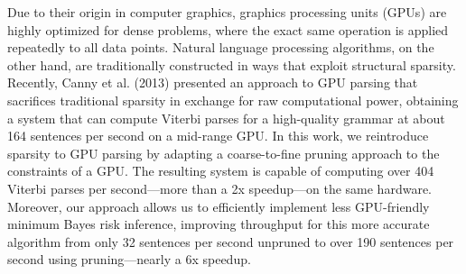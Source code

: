 Due to their origin in computer graphics, graphics processing units (GPUs) are highly optimized for dense problems, where the exact same operation is applied repeatedly to all data points. Natural language processing algorithms, on the other hand, are traditionally constructed in ways that exploit structural sparsity. Recently, Canny et al. (2013) presented an approach to GPU parsing that sacrifices traditional sparsity in exchange for raw computational power, obtaining a system that can compute Viterbi parses for a high-quality grammar at about 164 sentences per second on a mid-range GPU. In this work, we reintroduce sparsity to GPU parsing by adapting a coarse-to-fine pruning approach to the constraints of a GPU. The resulting system is capable of computing over 404 Viterbi parses per second—more than a 2x speedup—on the same hardware. Moreover, our approach allows us to efficiently implement less GPU-friendly minimum Bayes risk inference, improving throughput for this more accurate algorithm from only 32 sentences per second unpruned to over 190 sentences per second using pruning—nearly a 6x speedup.
